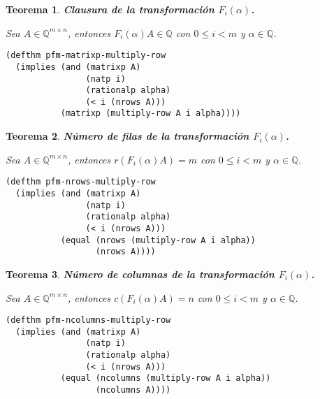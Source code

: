 \documentclass[a4paper,10pt]{article}
\newcommand{\Q}[1]{#1 \in \mathbb{Q}}
\newcommand{\M}[3]{#1 \in \mathbb{Q}^{#2 \times #3}}
\newtheorem{teor}{{Teorema}}
\begin{document}
\par \vspace{16pt}

\begin{teor} \textbf{Clausura de la transformación $F_{i}(\alpha)$.}\vspace{8pt}\par
Sea $\M{A}{m}{n}$, entonces $\Q{F_{i}(\alpha)A}$ con $0 \leq i < m$ y $\Q{\alpha}$.
\end{teor}

\begin{lstlisting}[language=clips]
(defthm pfm-matrixp-multiply-row
  (implies (and (matrixp A)
                (natp i)
                (rationalp alpha)
                (< i (nrows A)))
           (matrixp (multiply-row A i alpha))))
\end{lstlisting}

\par \vspace{16pt}

\begin{teor} \textbf{Número de filas de la transformación $F_{i}(\alpha)$.}\vspace{8pt}\par
Sea $\M{A}{m}{n}$, entonces $r(F_{i}(\alpha)A) = m$ con $0 \leq i < m$ y $\Q{\alpha}$.
\end{teor}

\begin{lstlisting}[language=clips]
(defthm pfm-nrows-multiply-row
  (implies (and (matrixp A)
                (natp i)
                (rationalp alpha)
                (< i (nrows A)))
           (equal (nrows (multiply-row A i alpha)) 
                  (nrows A))))
\end{lstlisting}

\par \vspace{16pt}

\begin{teor} \textbf{Número de columnas de la transformación $F_{i}(\alpha)$.}\vspace{8pt}\par
Sea $\M{A}{m}{n}$, entonces $c(F_{i}(\alpha)A) = n$ con $0 \leq i < m$ y $\Q{\alpha}$.
\end{teor}

\begin{lstlisting}[language=clips]
(defthm pfm-ncolumns-multiply-row
  (implies (and (matrixp A)
                (natp i)
                (rationalp alpha)
                (< i (nrows A)))
           (equal (ncolumns (multiply-row A i alpha))
                  (ncolumns A))))
\end{lstlisting}
\end{document}
